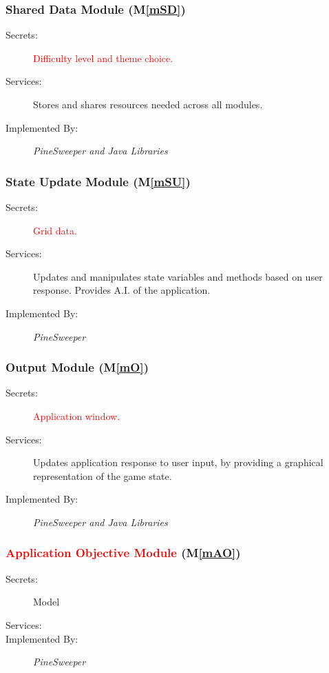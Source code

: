 \documentclass[12pt, titlepage]{article}
\newcommand{\mref}[1]{M\ref{#1}}
\begin{document}
\subsubsection{Shared Data Module (\mref{mSD})}
\begin{description}
\item[Secrets:] \textcolor{red}{Difficulty level and theme choice.}
\item[Services:] Stores and shares resources needed across all
   modules.
\item[Implemented By:] \textit{PineSweeper and Java Libraries}\\
\end{description}

\subsubsection{State Update Module (\mref{mSU})}
\begin{description}
\item[Secrets:] \textcolor{red}{Grid data.}
\item[Services:] Updates and manipulates state variables and
   methods based on user response. Provides A.I. of the application.
\item[Implemented By:] \textit{PineSweeper}\\
\end{description}

\subsubsection{Output Module (\mref{mO})}
\begin{description}
\item[Secrets:] \textcolor{red}{Application window.}
\item[Services:] Updates application response to user input,
   by providing a graphical representation of the game state.
\item[Implemented By:] \textit{PineSweeper and Java Libraries}\\
\end{description}

\subsubsection{\textcolor{red}{Application Objective Module} (\mref{mAO})}
\begin{description}
\item[Secrets:] Model
\item[Services:] \item[Implemented By:] \textit{PineSweeper}\\
\end{description}
\end{document}

